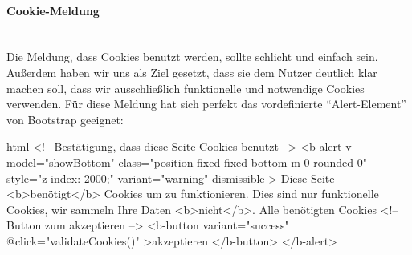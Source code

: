 \paragraph{Cookie-Meldung}
~\\
Die Meldung, dass Cookies benutzt werden, sollte schlicht und einfach sein. Außerdem haben wir uns als Ziel gesetzt, dass sie dem Nutzer deutlich klar machen soll, dass wir ausschließlich funktionelle und notwendige Cookies verwenden. Für diese Meldung hat sich perfekt das vordefinierte \enquote{Alert-Element} von Bootstrap geeignet:
\makeatletter
\begin{code}{html}
	<!-- Bestätigung, dass diese Seite Cookies benutzt -->
	<b-alert
		v-model="showBottom"
		class="position-fixed fixed-bottom m-0 rounded-0"
		style="z-index: 2000;"
		variant="warning"
		dismissible
	>
		Diese Seite <b>benötigt</b> Cookies um zu funktionieren. Dies sind nur
		funktionelle Cookies, wir sammeln Ihre Daten <b>nicht</b>. Alle benötigten
		Cookies
		<!-- Button zum akzeptieren -->
		<b-button variant="success" @click="validateCookies()"
			>akzeptieren
		</b-button>
	</b-alert>
\end{code}
\makeatother
{}
	\label{list:cookiehtml} ~\\
\newpage

